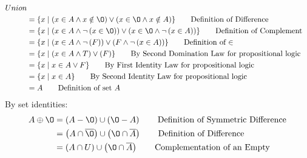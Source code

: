 \documentclass[12pt letter]{report}
\begin{document}
{\begin{enumerate}
\begin{align*}
{            Union}                                                                                                             \\
                        & = \{x  \mid \left( x \in A \wedge  x \notin \O \right)\vee  \left( x \in \O \wedge x \notin A
            \right)   \} \tag*{Definition of Difference}                                                                       \\
                        & = \{x  \mid \left( x \in A \wedge  \neg \left( x \in \O \right)  \right) \vee  \left( x
            \in \O \wedge
            \neg  \left( x \in A \right) \right)  \} \tag*{Definition of Complement}                                           \\
                        & = \{x  \mid \left( x \in A \wedge  \neg \left( F \right)  \right) \vee \left( F \wedge \neg \left( x
            \in A\right)   \right)   \} \tag*{Definition of $\in $}                                                            \\
                        & = \{x  \mid \left( x \in A \wedge T \right) \vee \left( F \right)  \} \tag*{By Second Domination Law
            for propositional logic}                                                                                           \\
                        & = \{x \mid x \in A \vee F\} \tag*{By First Identity Law for propositional logic}                     \\
                        & = \{x  \mid x \in A\} \tag*{By Second Identity Law for propositional logic}                          \\
                        & = A \tag*{Definition of set $A$}                                                                     \\
          \end{align*}
          By set identities:
          \begin{align*}
            A \oplus \O & = \left( A - \O \right)  \cup \left( \O - A \right)  \tag*{Definition of Symmetric Difference}       \\
                        & = \left( A \cap \overline{\O} \right) \cup \left( \O \cap \overline{A} \right) \tag*{Definition of
            Difference}                                                                                                        \\
                        & = \left( A \cap U \right) \cup \left( \O \cap \overline{A} \right) \tag*{Complementation of an Empty
}
\end{align*}
\end{enumerate}}
\end{document}
